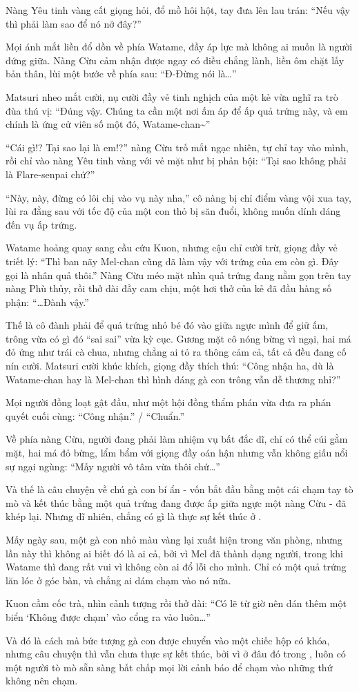 \documentclass[../main.tex]{subfiles}
\begin{document}
Nàng Yêu tinh vàng cất giọng hỏi, đổ mồ hôi hột, tay đưa lên lau trán: ``Nếu vậy thì phải làm sao để nó nở đây?''

Mọi ánh mắt liền đổ dồn về phía Watame, đầy áp lực mà không ai muốn là người đứng giữa. Nàng Cừu cảm nhận được ngay có điều chẳng lành, liền ôm chặt lấy bản thân, lùi một bước về phía sau: ``Đ-Đừng nói là\dots''

Matsuri nheo mắt cười, nụ cười đầy vẻ tinh nghịch của một kẻ vừa nghĩ ra trò đùa thú vị: ``Đúng vậy. Chúng ta cần một nơi ấm áp để ấp quả trứng này, và em chính là ứng cử viên số một đó, Watame-chan\~{}''

``Cái gì!? Tại sao lại là em!?'' nàng Cừu trố mắt ngạc nhiên, tự chỉ tay vào mình, rồi chỉ vào nàng Yêu tinh vàng với vẻ mặt như bị phản bội: ``Tại sao không phải là Flare-senpai chứ?''

``Này, này, đừng có lôi chị vào vụ này nha,'' cô nàng bị chỉ điểm vàng vội xua tay, lùi ra đằng sau với tốc độ của một con thỏ bị săn đuổi, không muốn dính dáng đến vụ ấp trứng.

Watame hoảng quay sang cầu cứu Kuon, nhưng cậu chỉ cười trừ, giọng đầy vẻ triết lý: ``Thì ban nãy Mel-chan cũng đã làm vậy với trứng của em còn gì. Đây gọi là nhân quả thôi.'' Nàng Cừu méo mặt nhìn quả trứng đang nằm gọn trên tay nàng Phù thủy, rồi thở dài đầy cam chịu, một hơi thở của kẻ đã đầu hàng số phận: ``\dots Đành vậy.''

Thế là cô đành phải để quả trứng nhỏ bé đó vào giữa ngực mình để giữ ấm, trông vừa có gì đó ``sai sai'' vừa kỳ cục. Gương mặt cô nóng bừng vì ngại, hai má đỏ ửng như trái cà chua, nhưng chẳng ai tỏ ra thông cảm cả, tất cả đều đang cố nín cười. Matsuri cười khúc khích, giọng đầy thích thú: ``Công nhận ha, dù là Watame-chan hay là Mel-chan thì hình dáng gà con trông vẫn dễ thương nhỉ?''

Mọi người đồng loạt gật đầu, như một hội đồng thẩm phán vừa đưa ra phán quyết cuối cùng: ``Công nhận.'' / ``Chuẩn.''

Về phía nàng Cừu, người đang phải làm nhiệm vụ bất đắc dĩ, chỉ có thể cúi gằm mặt, hai má đỏ bừng, lẩm bẩm với giọng đầy oán hận nhưng vẫn không giấu nổi sự ngại ngùng: ``Mấy người vô tâm vừa thôi chứ\dots''

Và thế là câu chuyện về chú gà con bí ẩn - vốn bắt đầu bằng một cái chạm tay tò mò và kết thúc bằng một quả trứng đang được ấp giữa ngực một nàng Cừu - đã khép lại. Nhưng dĩ nhiên, chẳng có gì là thực sự kết thúc ở \hll.

Mấy ngày sau, một gà con nhỏ màu vàng lại xuất hiện trong văn phòng, nhưng lần này thì không ai biết đó là ai cả, bởi vì Mel đã thành dạng người, trong khi Watame thì đang rất vui vì không còn ai đổ lỗi cho mình. Chỉ có một quả trứng lăn lóc ở góc bàn, và chẳng ai dám chạm vào nó nữa.

Kuon cầm cốc trà, nhìn cảnh tượng rồi thở dài: ``Có lẽ từ giờ nên dán thêm một biển `Không được chạm' vào cổng ra vào luôn\dots''

Và đó là cách mà bức tượng gà con được chuyển vào một chiếc hộp có khóa, nhưng câu chuyện thì vẫn chưa thực sự kết thúc, bởi vì ở đâu đó trong \hll, luôn có một người tò mò sẵn sàng bất chấp mọi lời cảnh báo để chạm vào những thứ không nên chạm.
\end{document}
